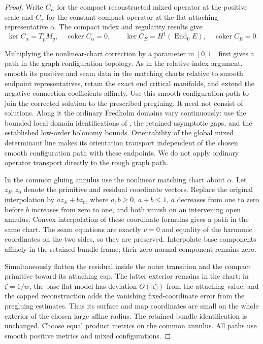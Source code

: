\documentclass[11pt]{amsart}
\theoremstyle{definition}
\theoremstyle{remark}
\theoremstyle{plain}
\begin{document}
\begin{proof}
Write $C_E$ for the compact reconstructed mixed operator at the
positive scale and $C_\alpha$ for the constant compact operator
at the flat attaching representative $\alpha$.
The compact index and regularity results give
\[
 \ker C_\alpha=T_pM_g,\quad\operatorname{coker}C_\alpha=0,
 \qquad
 \ker C_E=H^1(\operatorname{End}_0E),\quad
                         \operatorname{coker}C_E=0.
\]

Multiplying the nonlinear-chart correction by a parameter in
$[0,1]$ first gives a path in the graph configuration topology.
As in the relative-index argument, smooth its positive and seam
data in the matching charts relative to smooth endpoint representatives,
retain the exact end critical manifolds, and extend the negative
connection coefficients affinely. Use this smooth configuration
path to join the corrected solution to the prescribed pregluing.
It need not consist of solutions. Along it the ordinary
Fredholm domains vary continuously: use the bounded local domain
identifications of \cite[Proposition~5.27]{DaeFukLip21b},
the retained asymptotic gaps, and the established low-order
holonomy bounds.
Orientability of the global mixed determinant line
\cite[Section~4.7]{DaeFukLip21a} makes its orientation transport
independent of the chosen smooth configuration path with these
endpoints. We do not apply ordinary operator transport directly
to the rough graph path.

In the common gluing annulus use the nonlinear matching chart
about $\alpha$. Let $z_E,z_0$ denote the primitive and residual
coordinate vectors. Replace the original interpolation by
$a z_E+b z_0$, where $a,b\geq0$, $a+b\leq1$, $a$ decreases
from one to zero before $b$ increases from zero to one,
and both vanish on an intervening open annulus. Convex
interpolation of these coordinate formulas gives a path in the
same chart. The seam equations are exactly $v=0$ and equality
of the harmonic coordinates on the two sides, so they are
preserved. Interpolate base components affinely in the retained
bundle frame; their zero normal component remains zero.

Simultaneously flatten the residual inside the outer transition
and the compact primitive toward its attaching cap. The latter
exterior remains in the chart: in $\zeta=1/w$, the base-flat
model has deviation $O(|\zeta|)$ from the attaching value, and
the capped reconstruction adds the vanishing fixed-coordinate
error from the pregluing estimates. Thus its surface and map
coordinates are small on the whole exterior of the chosen
large affine radius. The retained bundle identification is
unchanged. Choose equal product metrics on the common annulus.
All paths use smooth positive metrics and mixed configurations.


\end{proof}
\end{document}
